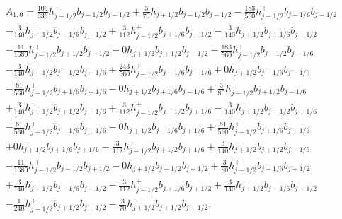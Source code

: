 \documentclass[12pt]{article}
\begin{document}
\begin{multline*} A_{1,0} = \frac{103}{336} h_{j-1/2}^+ b_{j-1/2} b_{j-1/2}+\frac{3}{70} h_{j+1/2}^- b_{j-1/2} b_{j-1/2}-\frac{183}{560} h_{j-1/2}^+ b_{j-1/6} b_{j-1/2}\\-\frac{3}{140} h_{j+1/2}^- b_{j-1/6} b_{j-1/2}+\frac{3}{112} h_{j-1/2}^+ b_{j+1/6} b_{j-1/2}-\frac{3}{140} h_{j+1/2}^- b_{j+1/6} b_{j-1/2}\\-\frac{11}{1680} h_{j-1/2}^+ b_{j+1/2} b_{j-1/2}-0 h_{j+1/2}^- b_{j+1/2} b_{j-1/2}-\frac{183}{560} h_{j-1/2}^+ b_{j-1/2} b_{j-1/6}\\-\frac{3}{140} h_{j+1/2}^- b_{j-1/2} b_{j-1/6}+\frac{243}{560} h_{j-1/2}^+ b_{j-1/6} b_{j-1/6}+0 h_{j+1/2}^- b_{j-1/6} b_{j-1/6}\\-\frac{81}{560} h_{j-1/2}^+ b_{j+1/6} b_{j-1/6}-0 h_{j+1/2}^- b_{j+1/6} b_{j-1/6}+\frac{3}{80} h_{j-1/2}^+ b_{j+1/2} b_{j-1/6}\\+\frac{3}{140} h_{j+1/2}^- b_{j+1/2} b_{j-1/6}+\frac{3}{112} h_{j-1/2}^+ b_{j-1/2} b_{j+1/6}-\frac{3}{140} h_{j+1/2}^- b_{j-1/2} b_{j+1/6}\\-\frac{81}{560} h_{j-1/2}^+ b_{j-1/6} b_{j+1/6}-0 h_{j+1/2}^- b_{j-1/6} b_{j+1/6}+\frac{81}{560} h_{j-1/2}^+ b_{j+1/6} b_{j+1/6}\\+0 h_{j+1/2}^- b_{j+1/6} b_{j+1/6}-\frac{3}{112} h_{j-1/2}^+ b_{j+1/2} b_{j+1/6}+\frac{3}{140} h_{j+1/2}^- b_{j+1/2} b_{j+1/6}\\-\frac{11}{1680} h_{j-1/2}^+ b_{j-1/2} b_{j+1/2}-0 h_{j+1/2}^- b_{j-1/2} b_{j+1/2}+\frac{3}{80} h_{j-1/2}^+ b_{j-1/6} b_{j+1/2}\\+\frac{3}{140} h_{j+1/2}^- b_{j-1/6} b_{j+1/2}-\frac{3}{112} h_{j-1/2}^+ b_{j+1/6} b_{j+1/2}+\frac{3}{140} h_{j+1/2}^- b_{j+1/6} b_{j+1/2}\\-\frac{1}{240} h_{j-1/2}^+ b_{j+1/2} b_{j+1/2}-\frac{3}{70} h_{j+1/2}^- b_{j+1/2} b_{j+1/2}, \end{multline*}
\end{document}
